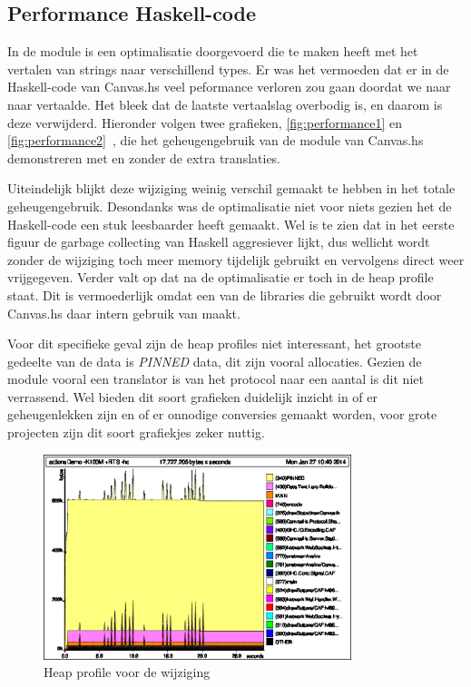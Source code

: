 \subsection{Performance Haskell-code}

In de module is een optimalisatie doorgevoerd die te maken heeft met het vertalen van strings naar verschillend types. Er was het vermoeden dat er in de Haskell-code van Canvas.hs veel peformance verloren zou gaan doordat we  naar  naar  vertaalde. Het bleek dat de laatste vertaalslag overbodig is, en daarom is deze verwijderd. Hieronder volgen twee grafieken, \autoref{fig:performance1} en \autoref{fig:performance2}~, die het geheugengebruik van de module van Canvas.hs demonstreren met en zonder de extra translaties.

Uiteindelijk blijkt deze wijziging weinig verschil gemaakt te hebben in het totale geheugengebruik. Desondanks was de optimalisatie niet voor niets gezien het de Haskell-code een stuk leesbaarder heeft gemaakt. Wel is te zien dat in het eerste figuur de garbage collecting van Haskell aggresiever lijkt, dus wellicht wordt zonder de wijziging toch meer memory tijdelijk gebruikt en vervolgens direct weer vrijgegeven. Verder valt op dat na de optimalisatie er toch  in de heap profile staat. Dit is vermoederlijk omdat een van de libraries die gebruikt wordt door Canvas.hs daar intern gebruik van maakt.

Voor dit specifieke geval zijn de heap profiles niet interessant, het grootste gedeelte van de data is \emph{PINNED} data, dit zijn vooral  allocaties. Gezien de module vooral een translator is van het protocol naar een aantal  is dit niet verrassend. Wel bieden dit soort grafieken duidelijk inzicht in of er geheugenlekken zijn en of er onnodige conversies gemaakt worden, voor grote projecten zijn dit soort grafiekjes zeker nuttig.

\begin{figure}[H]
\begin{center}
\includegraphics[keepaspectratio,width=0.8\textwidth]{./images/actionsDemoBeforeByteStrings.eps}
\caption{Heap profile voor de wijziging}
\label{fig:performance1}
\end{center}
\end{figure}


